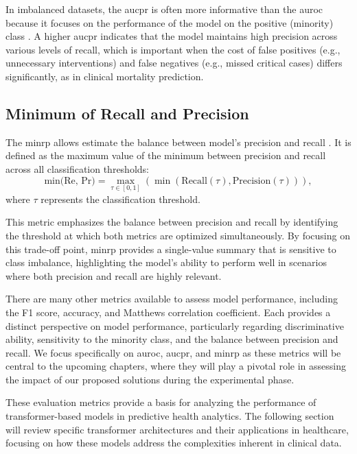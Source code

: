 In imbalanced datasets, the \gls{aucpr} is often more informative than the \gls{auroc} because it focuses on the performance of the model on the positive (minority) class \cite{PrecisionRecallPlot2015}. A higher \gls{aucpr} indicates that the model maintains high precision across various levels of recall, which is important when the cost of false positives (e.g., unnecessary interventions) and false negatives (e.g., missed critical cases) differs significantly, as in clinical mortality prediction.

\subsection{Minimum of Recall and Precision}

The \gls{minrp} allows estimate the balance between model's precision and recall \cite{STraTS2022}. It is defined as the maximum value of the minimum between precision and recall across all classification thresholds:
\[
    \text{min(Re, Pr)} = \max_{\tau \in [0,1]} \left( \min \left( \text{Recall}(\tau), \text{Precision}(\tau) \right) \right),
\]
where \(\tau\) represents the classification threshold.

This metric emphasizes the balance between precision and recall by identifying the threshold at which both metrics are optimized simultaneously. By focusing on this trade-off point, \gls{minrp} provides a single-value summary that is sensitive to class imbalance, highlighting the model's ability to perform well in scenarios where both precision and recall are highly relevant.


There are many other metrics available to assess model performance, including the F1 score, accuracy, and Matthews correlation coefficient. Each provides a distinct perspective on model performance, particularly regarding discriminative ability, sensitivity to the minority class, and the balance between precision and recall. We focus specifically on \gls{auroc}, \gls{aucpr}, and \gls{minrp} as these metrics will be central to the upcoming chapters, where they will play a pivotal role in assessing the impact of our proposed solutions during the experimental phase.

These evaluation metrics provide a basis for analyzing the performance of transformer-based models in predictive health analytics. The following section will review specific transformer architectures and their applications in healthcare, focusing on how these models address the complexities inherent in clinical data.

